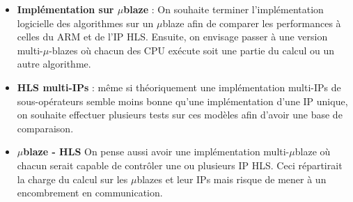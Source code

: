 \documentclass[12pt,a4paper]{ieee}
\begin{document}
\begin{itemize}
\item \textbf{Implémentation sur $\mu$blaze} : On souhaite terminer l'implémentation logicielle des algorithmes sur un $\mu$blaze afin de comparer les performances à celles du ARM et de l'IP HLS. Ensuite, on envisage passer à une version multi-$\mu$-blazes où chacun des CPU exécute soit une partie du calcul ou un autre algorithme.
\item \textbf{HLS multi-IPs} : même si théoriquement une implémentation multi-IPs de sous-opérateurs semble moins bonne qu'une implémentation d'une IP unique, on souhaite effectuer plusieurs tests sur ces modèles afin d'avoir une base de comparaison.
\item \textbf{$\mu$blaze - HLS} On pense aussi avoir une implémentation multi-$\mu$blaze où chacun serait capable de contrôler une ou plusieurs IP HLS. Ceci répartirait la charge du calcul sur les $\mu$blazes et leur IPs mais risque de mener à un encombrement en communication.
\end{itemize}
\end{document}
